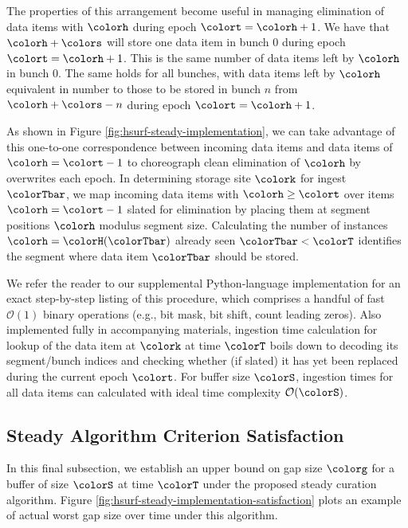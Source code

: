 

The properties of this arrangement become useful in managing elimination of data items with \hv{} $\colorh$ during epoch $\colort=\colorh + 1$.
We have that \hv{} $\colorh + \colors$ will store one data item in bunch 0 during epoch $\colort=\colorh + 1$.
This is the same number of data items left by \hv{} $\colorh$ in bunch 0.
The same holds for all bunches, with data items left by \hv{} $\colorh$ equivalent in number to those to be stored in bunch $n$ from \hv{} $\colorh + \colors - n$ during epoch $\colort = \colorh + 1$.

As shown in Figure \ref{fig:hsurf-steady-implementation}, we can take advantage of this one-to-one correspondence between incoming data items and data items of \hv{} $\colorh=\colort-1$ to choreograph clean elimination of \hv{} $\colorh$ by overwrites each epoch.
In determining storage site $\colork$ for ingest $\colorTbar$, we map incoming data items with \hv{} $\colorh \geq \colort$ over items $\colorh = \colort - 1$ slated for elimination by placing them at segment positions $\colorh$ modulus segment size.
Calculating the number of \hv{} instances $\colorh = \colorH(\colorTbar)$ already seen $\colorTbar < \colorT$ identifies the segment where data item $\colorTbar$ should be stored.



We refer the reader to our supplemental Python-language implementation for an exact step-by-step listing of this procedure, which comprises a handful of fast $\mathcal{O}(1)$ binary operations (e.g., bit mask, bit shift, count leading zeros).
Also implemented fully in accompanying materials, ingestion time calculation for lookup of the data item at $\colork$ at time $\colorT$ boils down to decoding its segment/bunch indices and checking whether (if slated) it has yet been replaced during the current epoch $\colort$.
For buffer size $\colorS$, ingestion times for all data items can calculated with ideal time complexity $\mathcal{O}(\colorS)$.

\subsection{Steady Algorithm Criterion Satisfaction}
\label{sec:stready-satisfaction}

In this final subsection, we establish an upper bound on gap size $\colorg$ for a buffer of size $\colorS$ at time $\colorT$ under the proposed steady curation algorithm.
Figure \ref{fig:hsurf-steady-implementation-satisfaction} plots an example of actual worst gap size over time under this algorithm.


